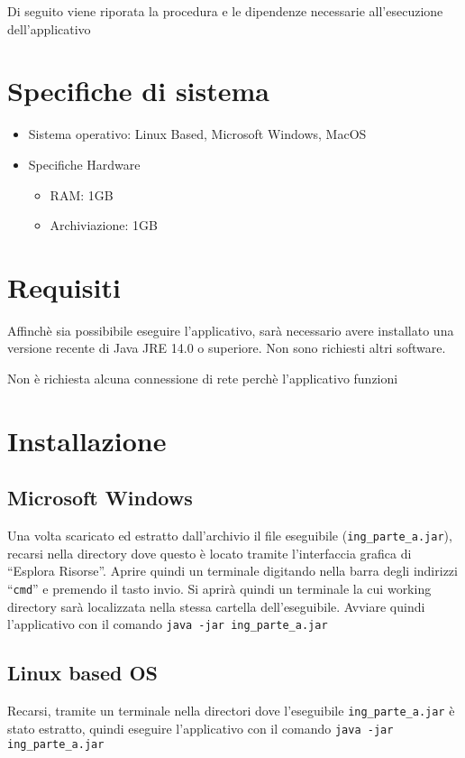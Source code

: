 Di seguito viene riporata la procedura e le dipendenze necessarie all'esecuzione dell'applicativo

\section{Specifiche di sistema}
\begin{itemize}
    \item Sistema operativo: Linux Based, Microsoft Windows, MacOS
    \item Specifiche Hardware
    \begin{itemize}
        \item RAM: 1GB
        \item Archiviazione: 1GB
    \end{itemize}
\end{itemize}

\section{Requisiti}

Affinchè sia possibibile eseguire l'applicativo, sarà necessario avere installato una versione recente di Java JRE 14.0 o superiore.
Non sono richiesti altri software.

Non è richiesta alcuna connessione di rete perchè l'applicativo funzioni

\section{Installazione}

\subsection{Microsoft Windows}
Una volta scaricato ed estratto dall'archivio il file eseguibile (\texttt{ing\_parte\_a.jar}), recarsi nella directory dove questo è locato tramite l'interfaccia grafica di ``Esplora Risorse''.
Aprire quindi un terminale digitando nella barra degli indirizzi ``\texttt{cmd}'' e premendo il tasto invio.
Si aprirà quindi un terminale la cui working directory sarà localizzata nella stessa cartella dell'eseguibile.
Avviare quindi l'applicativo con il comando \texttt{java -jar ing\_parte\_a.jar}

\subsection{Linux based OS}
Recarsi, tramite un terminale nella directori dove l'eseguibile \texttt{ing\_parte\_a.jar} è stato estratto, quindi eseguire l'applicativo con il comando \texttt{java -jar ing\_parte\_a.jar}